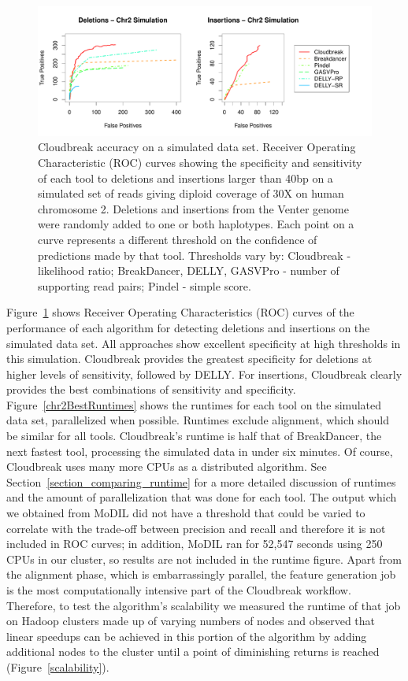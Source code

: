 \begin{figure}
\centering
\includegraphics[width=1\textwidth]{figures/CHR2SIM_ROC_COMBINED_ROCS_POSTER.pdf}
\caption[Cloudbreak accuracy on a simulated data set.]{Cloudbreak accuracy on a simulated data set. Receiver Operating Characteristic (ROC) curves showing the specificity and sensitivity of each tool to deletions and insertions larger than 40bp on a simulated set of reads giving diploid coverage of 30X on human chromosome 2. Deletions and insertions from the Venter genome were randomly added to one or both haplotypes. Each point on a curve represents a different threshold on the confidence of predictions made by that tool. Thresholds vary by: Cloudbreak - likelihood ratio; BreakDancer, DELLY, GASVPro - number of supporting read pairs; Pindel - simple score.}
\label{chr2CombinedRoc}
\end{figure}

Figure~\ref{chr2CombinedRoc} shows Receiver Operating Characteristics (ROC) curves of the performance of each algorithm for detecting deletions and insertions on the simulated data set. All approaches show excellent specificity at high thresholds in this simulation. Cloudbreak provides the greatest specificity for deletions at higher levels of sensitivity, followed by DELLY. For insertions, Cloudbreak clearly provides the best combinations of sensitivity and specificity. Figure~\ref{chr2BestRuntimes} shows the runtimes for each tool on the simulated data set, parallelized when possible. Runtimes exclude alignment, which should be similar for all tools. Cloudbreak's runtime is half that of BreakDancer, the next fastest tool, processing the simulated data in under six minutes. Of course, Cloudbreak uses many more CPUs as a distributed algorithm. See Section~\ref{section_comparing_runtime} for a more detailed discussion of runtimes and the amount of parallelization that was done for each tool. The output which we obtained from MoDIL did not have a threshold that could be varied to correlate with the trade-off between precision and recall and therefore it is not included in ROC curves; in addition, MoDIL ran for 52,547 seconds using 250 CPUs in our cluster, so results are not included in the runtime figure. Apart from the alignment phase, which is embarrassingly parallel, the feature generation job is the most computationally intensive part of the Cloudbreak workflow. Therefore, to test the algorithm's scalability we measured the runtime of that job on Hadoop clusters made up of varying numbers of nodes and observed that linear speedups can be achieved in this portion of the algorithm by adding additional nodes to the cluster until a point of diminishing returns is reached (Figure~\ref{scalability}).

